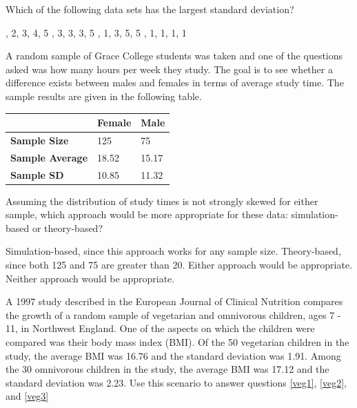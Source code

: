 \documentclass{article}
\begin{document}
\begin{mcquestions}
		\question Which of the following data sets has the largest standard deviation?
		\begin{mcanswerslist}
			, 2, 3, 4, 5
			, 3, 3, 3, 5
			, 1, 3, 5, 5
			, 1, 1, 1, 1
		\end{mcanswerslist}
		
		\begin{mcquestioninstruction}
			A random sample of Grace College students was taken and one of the questions asked was how many hours per week they study.  The goal is to see whether a difference exists between males and females in terms of average study time.  The sample results are given in the following table.
			\begin{center}
				\begin{tabular}{| l | l | l |}
					\hline
					& \textbf{Female} & \textbf{Male} \\
					\hline
					\textbf{Sample Size} & 125 & 75 \\
					\hline
					\textbf{Sample Average} & 18.52 & 15.17 \\
					\hline
					\textbf{Sample SD} & 10.85 & 11.32 \\
					\hline
				\end{tabular}
			\end{center}
		\end{mcquestioninstruction}
		
		\question Assuming the distribution of study times is not strongly skewed for either sample, which approach would be more appropriate for these data: simulation-based or theory-based?
		\begin{mcanswerslist}
			\answer Simulation-based, since this approach works for any sample size.
			\answer Theory-based, since both 125 and 75 are greater than 20.
			\answer[correct] Either approach would be appropriate.
			\answer Neither approach would be appropriate.
		\end{mcanswerslist}
		
		\begin{mcquestioninstruction}
			A 1997 study described in the European Journal of Clinical Nutrition compares the growth of a random sample of vegetarian and omnivorous children, ages 7 - 11, in Northwest England. One of the aspects on which the children were compared was their body mass index (BMI). Of the 50 vegetarian children in the study, the average BMI was 16.76 and the standard deviation was 1.91. Among the 30 omnivorous children in the study, the average BMI was 17.12 and the standard deviation was 2.23.  Use this scenario to answer questions \ref{veg1}, \ref{veg2}, and \ref{veg3}
		\end{mcquestioninstruction}
		

\end{mcquestions}
\end{document}
